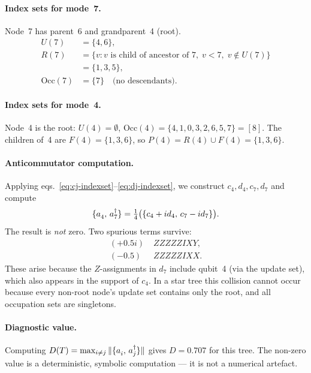 \documentclass[aps,pra,twocolumn,superscriptaddress,showpacs]{revtex4-2}
\newcommand{\ad}[1]{a_{#1}^{\dagger}}       %
\newcommand{\an}[1]{a_{#1}^{\vphantom{\dagger}}} %
\newcommand{\acomm}[2]{\{#1,\,#2\}}         %
\newcommand{\Uset}[1]{U(#1)}                %
\newcommand{\Pset}[1]{P(#1)}                %
\newcommand{\Rset}[1]{R(#1)}                %
\newcommand{\Occ}[1]{\mathrm{Occ}(#1)}      %
\theoremstyle{definition}
\begin{document}
\paragraph{Index sets for mode~7.}
Node~7 has parent~6 and grandparent~4 (root).
\begin{align*}
  \Uset{7} &= \{4, 6\}, \\
  \Rset{7} &= \{v : v \text{ is child of ancestor of } 7,\;
               v < 7,\; v \notin \Uset{7}\} \\
           &= \{1, 3, 5\}, \\
  \Occ{7}  &= \{7\} \quad \text{(no descendants)}.
\end{align*}

\paragraph{Index sets for mode~4.}
Node~4 is the root: $\Uset{4} = \emptyset$,
$\Occ{4} = \{4, 1, 0, 3, 2, 6, 5, 7\} = [8]$.
The children of~4 are $F(4) = \{1, 3, 6\}$, so
$\Pset{4} = \Rset{4} \cup F(4) = \{1, 3, 6\}$.

\paragraph{Anticommutator computation.}
Applying eqs.~\eqref{eq:cj-indexset}--\eqref{eq:dj-indexset}, we
construct $c_4, d_4, c_7, d_7$ and compute
\begin{equation*}
  \acomm{\an{4}}{\ad{7}}
    = \tfrac{1}{4}\bigl(\acomm{c_4 + id_4}{c_7 - id_7}\bigr).
\end{equation*}
The result is \emph{not} zero.  Two spurious terms survive:
\begin{align*}
  (+0.5i)\; &ZZZZZIXY, \\
  (-0.5)\;  &ZZZZZIXX.
\end{align*}
These arise because the $Z$-assignments in $d_7$ include qubit~4
(via the update set), which also appears in the support of $c_4$.
In a star tree this collision cannot occur because every non-root
node's update set contains only the root, and all occupation sets
are singletons.

\paragraph{Diagnostic value.}
Computing $D(T) = \max_{i \neq j} \|\acomm{\an{i}}{\ad{j}}\|$
gives $D = 0.707$ for this tree.  The non-zero value is a
deterministic, symbolic computation --- it is not a numerical artefact.
\end{document}
